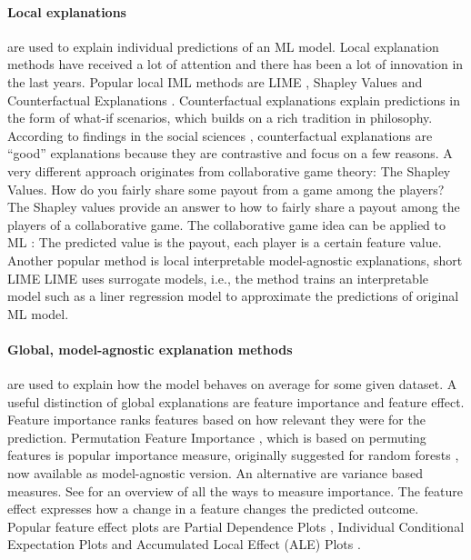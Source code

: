 \documentclass[runningheads]{llncs}
\begin{document}
\paragraph{Local explanations} are used to explain individual predictions of an ML model.
Local explanation methods have received a lot of attention and there has been a lot of innovation in the last years.
Popular local IML methods are LIME \cite{ribeiro2016should}, Shapley Values \cite{lundberg2017unified,vstrumbelj2014explaining} and Counterfactual Explanations \cite{wachter2017counterfactual,dandl2020multi}.
Counterfactual explanations explain predictions in the form of what-if scenarios, which builds on a rich tradition in philosophy.
According to findings in the social sciences \cite{miller2019explanation}, counterfactual explanations are \enquote{good} explanations because they are contrastive and focus on a few reasons.
A very different approach originates from collaborative game theory: The Shapley Values.
How do you fairly share some payout from a game among the players?
The Shapley values \cite{shapley1953value} provide an answer to how to fairly share a payout among the players of a collaborative game.
The collaborative game idea can be applied to ML \cite{vstrumbelj2014explaining,lundberg2017unified,lundberg2018consistent}: The predicted value is the payout, each player is a certain feature value.
Another popular method is local interpretable model-agnostic explanations, short LIME \cite{ribeiro2016should}
LIME uses surrogate models, i.e., the method trains an interpretable model such as a liner regression model to approximate the predictions of original ML model.

\paragraph{Global, model-agnostic explanation methods} are used to explain how the model behaves on average for some given dataset.
A useful distinction of global explanations are feature importance and feature effect.
Feature importance ranks features based on how relevant they were for the prediction.
Permutation Feature Importance \cite{fisher2019all}, which is based on permuting features is popular importance measure, originally suggested for random forests \cite{breiman2001random}, now available as model-agnostic version.
An alternative are variance based measures.
See \cite{wei2015variable} for an overview of all the ways to measure importance.
The feature effect expresses how a change in a feature changes the predicted outcome.
Popular feature effect plots are Partial Dependence Plots \cite{friedman2001greedy}, Individual Conditional Expectation Plots \cite{goldstein2015peeking} and Accumulated Local Effect  (ALE)  Plots \cite{apley2016visualizing}.
\end{document}
